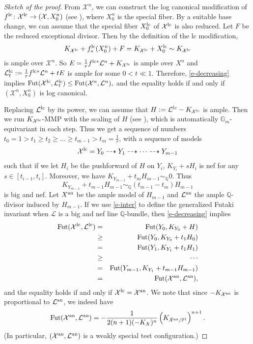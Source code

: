 \documentclass[12pt,reqno]{amsart}%
\newcommand{\cX}{{\mathcal{X}}}
\newcommand{\cL}{{\mathcal{L}}}
\theoremstyle{definition}
\theoremstyle{remark}
\newcommand{\Fut}{{\rm Fut}}
\begin{document}
\begin{proof}[Sketch of the proof]
 From $\cX^n$, we can construct the log canonical modification of $f^{\rm lc}\colon \cX^{\rm lc}\to (\cX,X^n_0)$ (see \cite[Theorem 1.32]{Kol13}), where $X^n_0$ is the special fiber. By a suitable base change, we can assume that the special fiber $X^{\rm lc}_0$ of $\cX^{\rm lc}$ is also reduced. Let $F$ be the reduced exceptional divisor. Then by the definition of the lc modification, 
$$K_{\cX^{\rm lc}}+f^{\rm lc}_*(X^n_0)+F=K_{\cX^{\rm lc}}+X^{\rm lc}_0\sim K_{\cX^{\rm lc}}$$
 is ample over $\cX^n$.   So $E=\frac{1}{r}f^{{\rm lc}*}\cL^n+K_{\cX^{\rm lc }}$ is ample over $X^n$ and $\cL^{\rm lc}_t:=\frac{1}{r}f^{{\rm lc}*}\cL^n+tE$ is ample  for some $0<t\ll 1$. Therefore, \eqref{e-decreasing} implies
$ \Fut(\cX^{\rm lc},\cL^{\rm lc}_t)\le \Fut(\cX^n,\cL^n),$
and the equality holds if and only if $(\cX^n,X^n_0)$ is log canonical. 
%
\medskip

 Replacing $\cL^{\rm lc}$ by its power, we can assume that $H:=\cL^{lc}-K_{\cX^{\rm lc}}$ is ample. Then we run $K_{\cX^{\rm lc}}$-MMP with the scaling of $H$ (see \cite{BCHM10}), which is automatically $\mathbb{G}_m$-equivariant in each step. Thus we get a sequence of numbers $t_0=1>t_1\ge t_2\ge...\ge t_{m-1}> t_m=\frac{1}{r}$, with a sequence of models
\[
\cX^{\rm lc}=Y_0\dasharrow Y_1\dasharrow \cdots \dasharrow Y_{m-1}
\]
such that if we let $H_i$ be the pushforward of $H$ on $Y_i$, $K_{Y_i}+sH_i$ is nef for any $s\in [t_{i-1},t_i]$. Moreover, we have $K_{Y_{m-1}}+t_mH_{m-1}\sim _{\mathbb{Q}} 0$. Thus 
\[
K_{Y_{m-1}}+t_{m-1}H_{m-1}\sim_{\mathbb{Q}}(t_{m-1}-t_m)H_{m-1}
\]
is big and nef. Let $X^{\rm an}$ be the ample model of $H_{m-1}$ and $\cL^{\rm an}$ the ample $\mathbb{Q}$-divisor induced by $H_{m-1}$. If we use \eqref{e-inter} to define the generalized Futaki invariant  when $\cL$ is a big and nef line $\mathbb{Q}$-bundle, then \eqref{e-decreasing} implies 
\begin{eqnarray*}
\Fut(\cX^{\rm lc},\cL^{\rm lc})&=&\Fut(Y_0, K_{Y_0}+H)\\
&\ge &\Fut(Y_0, K_{Y_0}+t_1H_0)\\
&=& \Fut(Y_1, K_{Y_1}+t_1H_1)\\
&\ge& \cdots\\
&=& \Fut(Y_{m-1}, K_{Y_1}+t_{m-1}H_{m-1})\\
&=& \Fut(\cX^{\rm an}, \cL^{\rm an}),
\end{eqnarray*}
 and the equality holds if and only if $\cX^{\rm lc}=\cX^{\rm an}$. We note that since $-K_{\cX^{\rm an}}$ is proportional to $\cL^{\rm an}$, we indeed have 
 \begin{eqnarray}\label{e-anti}
  \Fut(\cX^{\rm an}, \cL^{\rm an})=-\frac{1}{2(n+1)(-K_X)^n}\left(K_{\bar{\cX}^{\rm an}/\mathbb{P}^1}\right)^{n+1}.
\end{eqnarray}
\medskip
(In particular, $(\cX^{\rm an}, \cL^{\rm an})$ is a weakly special test configuration.)


\end{proof}
\end{document}
